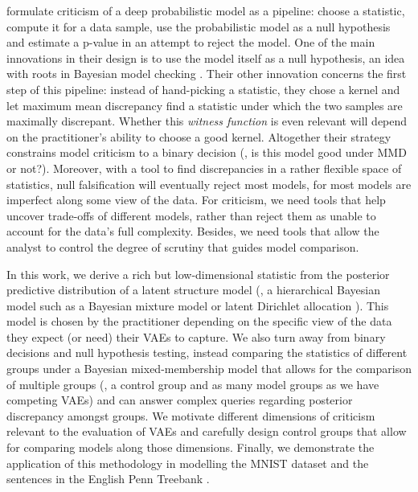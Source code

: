 \citet{LloydEtAl2015} formulate criticism of a deep probabilistic model as a pipeline: choose a statistic, compute it for a data sample, use the probabilistic model as a null hypothesis and estimate a p-value in an attempt to reject the model.
One of the main innovations in their design is to use the model itself as a null hypothesis, an idea with roots in Bayesian model checking \citep{gelman1996posterior}.
Their other innovation concerns the first step of this pipeline: instead of hand-picking a statistic, they chose a kernel and let maximum mean discrepancy \citep[MMD;][]{gretton2012kernel} find a statistic under which the two samples are maximally discrepant. Whether this \emph{witness function} is even relevant will depend on the practitioner's ability to choose a good kernel. %
Altogether their strategy constrains model criticism to a  binary decision (\ie, is this model good under MMD or not?). Moreover, with a tool to find discrepancies in a rather flexible space of statistics, null falsification will eventually reject most models, for most models are imperfect along some view of the data. For criticism, we need tools that help uncover trade-offs of different models, rather than reject them as unable to account for the data's full complexity. Besides, we need tools that allow the analyst to control the degree of scrutiny that guides model comparison.

In this work, we derive a rich but low-dimensional statistic from the posterior predictive distribution of a latent structure model (\eg, a hierarchical Bayesian model such as a Bayesian mixture model or latent Dirichlet allocation \citep{blei2003lda}). This model is chosen by the practitioner depending on the specific view of the data they expect (or need) their VAEs to capture.
We also turn away from binary decisions and null hypothesis testing, instead comparing the statistics of different groups under a Bayesian mixed-membership model that allows for the comparison of multiple groups (\ie, a control group and as many model groups as we have competing VAEs) and can answer complex queries regarding posterior discrepancy amongst groups. We motivate different dimensions of criticism relevant to the evaluation of VAEs and carefully design control groups that allow for comparing models along those dimensions.
Finally, we demonstrate the application of this methodology in modelling the MNIST dataset \citep{deng2012mnist} and the sentences in the English Penn Treebank \citep{marcus1993ptb}.

